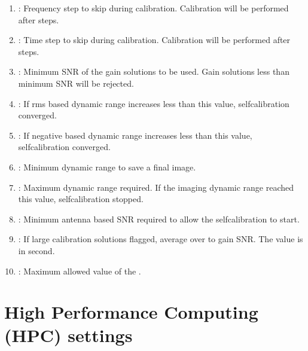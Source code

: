 \documentclass[letterpaper,10pt,english]{sphinxmanual}
\begin{document}
\begin{enumerate}
\item {} 
\sphinxAtStartPar
{} :  Frequency step to skip during calibration. Calibration will be performed after  steps.

\item {} 
\sphinxAtStartPar
{} : Time step to skip during calibration. Calibration will be performed after  steps.

\item {} 
\sphinxAtStartPar
{} : Minimum SNR of the gain solutions to be used. Gain solutions less than minimum SNR will be rejected.

\item {} 
\sphinxAtStartPar
{} : If rms based dynamic range increases less than this value, self\sphinxhyphen{}calibration converged.

\item {} 
\sphinxAtStartPar
{} : If negative based dynamic range increases less than this value, self\sphinxhyphen{}calibration converged.

\item {} 
\sphinxAtStartPar
{} : Minimum dynamic range to save a final image.

\item {} 
\sphinxAtStartPar
{} : Maximum dynamic range required. If the imaging dynamic range reached this value, self\sphinxhyphen{}calibration stopped.

\item {} 
\sphinxAtStartPar
{} : Minimum antenna based SNR required to allow the self\sphinxhyphen{}calibration to start.

\item {} 
\sphinxAtStartPar
{} : If large calibration solutions flagged, average over  to gain SNR. The value is in second.

\item {} 
\sphinxAtStartPar
{} : Maximum allowed value of the .

\end{enumerate}


\section{High Performance Computing (HPC) settings}
\label{\detokenize{inputs:high-performance-computing-hpc-settings}}
\end{document}
